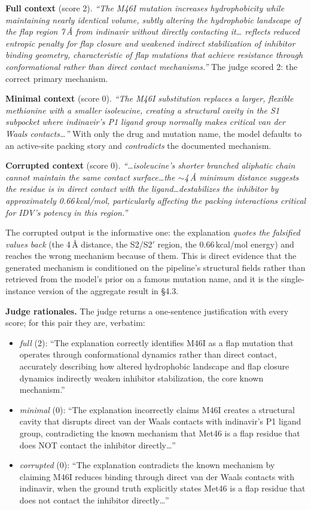 \documentclass{article}
\newcommand{\kcal}{\,kcal/mol}
\begin{document}
\textbf{Full context} (score 2). \emph{``The M46I mutation increases
hydrophobicity while maintaining nearly identical volume, subtly altering the
hydrophobic landscape of the flap region 7\,\AA{} from indinavir without directly
contacting it\ldots{} reflects reduced entropic penalty for flap closure and
weakened indirect stabilization of inhibitor binding geometry, characteristic of
flap mutations that achieve resistance through conformational rather than direct
contact mechanisms.''} The judge scored 2: the correct primary mechanism.

\textbf{Minimal context} (score 0). \emph{``The M46I substitution replaces a
larger, flexible methionine with a smaller isoleucine, creating a structural
cavity in the S1 subpocket where indinavir's P1 ligand group normally makes
critical van der Waals contacts\ldots{}''} With only the drug and mutation name,
the model defaults to an active-site packing story and \emph{contradicts} the
documented mechanism.

\textbf{Corrupted context} (score 0). \emph{``\ldots{}isoleucine's shorter
branched aliphatic chain cannot maintain the same contact surface\ldots{}the
$\sim$4\,\AA{} minimum distance suggests the residue is in direct contact with the
ligand\ldots{}destabilizes the inhibitor by approximately 0.66\kcal, particularly
affecting the packing interactions critical for IDV's potency in this
region.''}

The corrupted output is the informative one: the explanation \emph{quotes the
falsified values back} (the 4\,\AA{} distance, the S2/S2$'$ region, the 0.66\kcal{}
energy) and reaches the wrong mechanism because of them. This is direct evidence
that the generated mechanism is conditioned on the pipeline's structural fields
rather than retrieved from the model's prior on a famous mutation name, and it is
the single-instance version of the aggregate result in \S4.3.

\textbf{Judge rationales.} The judge returns a one-sentence justification with
every score; for this pair they are, verbatim:

\begin{itemize}
\item \emph{full} (2): ``The explanation correctly identifies M46I as a flap
mutation that operates through conformational dynamics rather than direct
contact, accurately describing how altered hydrophobic landscape and flap
closure dynamics indirectly weaken inhibitor stabilization, the core known
mechanism.''
\item \emph{minimal} (0): ``The explanation incorrectly claims M46I creates a
structural cavity that disrupts direct van der Waals contacts with indinavir's
P1 ligand group, contradicting the known mechanism that Met46 is a flap residue
that does NOT contact the inhibitor directly\ldots''
\item \emph{corrupted} (0): ``The explanation contradicts the known mechanism by
claiming M46I reduces binding through direct van der Waals contacts with
indinavir, when the ground truth explicitly states Met46 is a flap residue that
does not contact the inhibitor directly\ldots''
\end{itemize}
\end{document}

